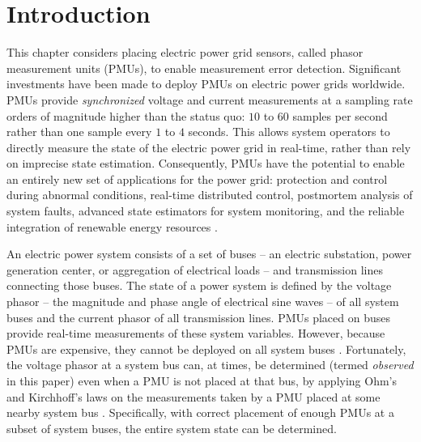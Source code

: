 \section{Introduction}
\label{sec:intro-pmu}

This chapter considers placing electric power grid sensors, called phasor measurement units (PMUs), to enable measurement error detection.
Significant investments have been made to deploy PMUs on electric power grids worldwide. PMUs provide \emph{synchronized} voltage and current measurements at a sampling rate orders 
of magnitude higher than the status quo: $10$ to $60$ samples per second rather than one sample every $1$ to $4$ seconds.  This allows system operators to directly measure the state of the electric power grid in real-time, rather than 
rely on imprecise state estimation. Consequently, PMUs have the potential to enable
an entirely new set of applications for the power grid:  protection and control during abnormal conditions, real-time distributed control, postmortem analysis of system faults,
advanced state estimators for system monitoring, and the reliable integration of renewable energy resources \cite{Naspi10}.

An electric power system consists of a set of buses  -- an electric substation, power generation center, or aggregation of electrical loads -- and transmission lines connecting those buses.
The state of a power system is defined by the voltage phasor -- the magnitude and phase angle of electrical sine waves -- of all system buses and the current phasor of all transmission lines.
PMUs placed on buses provide real-time measurements of these system variables.
However, because PMUs are expensive, they cannot be deployed on all system buses \cite{Baldwin93}\cite{LaRee10}. Fortunately, the voltage phasor at a system bus can, at times, 
be determined (termed {\it observed} in this paper) even when a PMU is not placed at that bus, by applying Ohm's and Kirchhoff's laws
on the measurements taken by a PMU placed at some nearby system bus \cite{Baldwin93}\cite{Brueni05}. Specifically, with correct placement of enough PMUs at a subset of system buses, the entire system state can be determined. 

